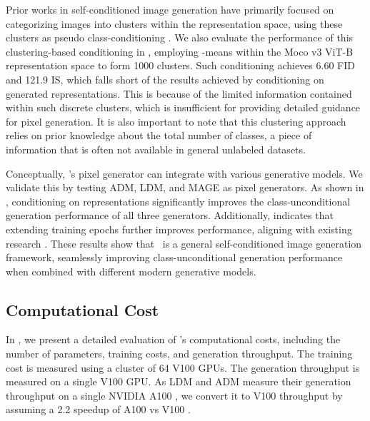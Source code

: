 Prior works in self-conditioned image generation have primarily focused on categorizing images into clusters within the representation space, using these clusters as pseudo class-conditioning \cite{liu2020diverse, bao2022conditional, Hu_2023_CVPR}. We also evaluate the performance of this clustering-based conditioning in \name, employing -means within the Moco v3 ViT-B representation space to form 1000 clusters. Such conditioning achieves 6.60 FID and 121.9 IS, which falls short of the results achieved by conditioning on generated representations. This is because of the limited information contained within such discrete clusters, which is insufficient for providing detailed guidance for pixel generation. It is also important to note that this clustering approach relies on prior knowledge about the total number of classes, a piece of information that is often not available in general unlabeled datasets.

Conceptually, \name's pixel generator can integrate with various generative models. We validate this by testing ADM, LDM, and MAGE as pixel generators. As shown in , conditioning on representations significantly improves the class-unconditional generation performance of all three generators. Additionally,  indicates that extending training epochs further improves performance, aligning with existing research \cite{dhariwal2021diffusion, rombach2022high, li2023mage}. These results show that \name~is a general self-conditioned image generation framework, seamlessly improving class-unconditional generation performance when combined with different modern generative models.

\subsection{Computational Cost}

In , we present a detailed evaluation of \name's computational costs, including the number of parameters, training costs, and generation throughput. The training cost is measured using a cluster of 64 V100 GPUs. The generation throughput is measured on a single V100 GPU. As LDM and ADM measure their generation throughput on a single NVIDIA A100 \cite{rombach2022high}, we convert it to V100 throughput by assuming a 2.2 speedup of A100 vs V100 \cite{v100vsa100}.

